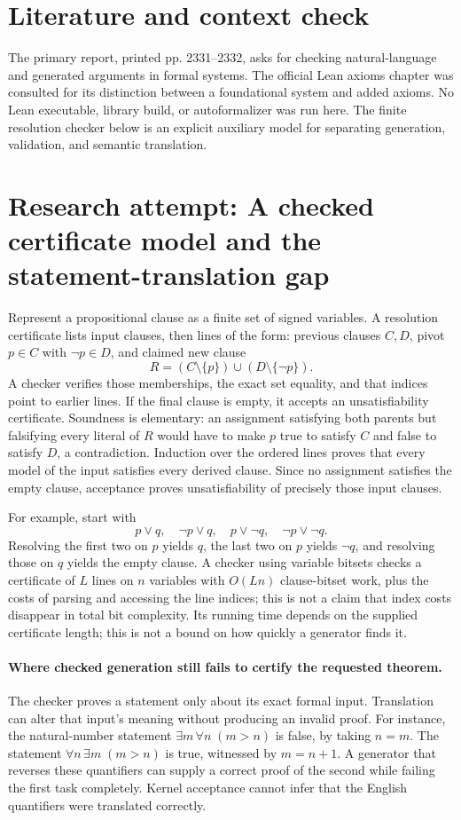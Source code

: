 \documentclass[11pt]{article}
\begin{document}
\section{Literature and context check}
The primary report, printed pp. 2331--2332, asks for checking natural-language and generated arguments in formal systems. The official Lean axioms chapter was consulted for its distinction between a foundational system and added axioms. No Lean executable, library build, or autoformalizer was run here. The finite resolution checker below is an explicit auxiliary model for separating generation, validation, and semantic translation.
\section{Research attempt: A checked certificate model and the statement-translation gap}

Represent a propositional clause as a finite set of signed variables. A resolution certificate lists input clauses, then lines of the form: previous clauses $C,D$, pivot $p\in C$ with $\neg p\in D$, and claimed new clause
\[
R=(C\setminus\{p\})\cup(D\setminus\{\neg p\}).
\]
A checker verifies those memberships, the exact set equality, and that indices point to earlier lines. If the final clause is empty, it accepts an unsatisfiability certificate. Soundness is elementary: an assignment satisfying both parents but falsifying every literal of $R$ would have to make $p$ true to satisfy $C$ and false to satisfy $D$, a contradiction. Induction over the ordered lines proves that every model of the input satisfies every derived clause. Since no assignment satisfies the empty clause, acceptance proves unsatisfiability of precisely those input clauses.

For example, start with
\[
p\vee q,\quad\neg p\vee q,\quad p\vee\neg q,\quad\neg p\vee\neg q.
\]
Resolving the first two on $p$ yields $q$, the last two on $p$ yields $\neg q$, and resolving those on $q$ yields the empty clause. A checker using variable bitsets checks a certificate of $L$ lines on $n$ variables with $O(Ln)$ clause-bitset work, plus the costs of parsing and accessing the line indices; this is not a claim that index costs disappear in total bit complexity. Its running time depends on the supplied certificate length; this is not a bound on how quickly a generator finds it.

\paragraph{Where checked generation still fails to certify the requested theorem.}
The checker proves a statement only about its exact formal input. Translation can alter that input's meaning without producing an invalid proof. For instance, the natural-number statement $\exists m\,\forall n\;(m>n)$ is false, by taking $n=m$. The statement $\forall n\,\exists m\;(m>n)$ is true, witnessed by $m=n+1$. A generator that reverses these quantifiers can supply a correct proof of the second while failing the first task completely. Kernel acceptance cannot infer that the English quantifiers were translated correctly.
\end{document}
